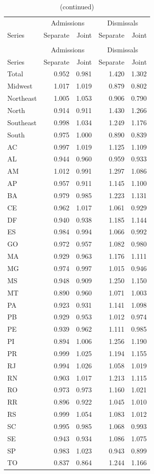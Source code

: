 \begin{longtable}{lrrrr}
\hline
 & \multicolumn{2}{c}{Admissions} & \multicolumn{2}{c}{Dismissals} \\
Series & Separate & Joint & Separate & Joint \\
\hline
\endfirsthead
\caption[]{(continued)} \\
\hline
 & \multicolumn{2}{c}{Admissions} & \multicolumn{2}{c}{Dismissals} \\
Series & Separate & Joint & Separate & Joint \\
\hline
\endhead
Total & 0.952 & 0.981 & 1.420 & 1.302 \\
Midwest & 1.017 & 1.019 & 0.879 & 0.802 \\
Northeast & 1.005 & 1.053 & 0.906 & 0.790 \\
North & 0.914 & 0.911 & 1.430 & 1.266 \\
Southeast & 0.998 & 1.034 & 1.249 & 1.176 \\
South & 0.975 & 1.000 & 0.890 & 0.839 \\
AC & 0.997 & 1.019 & 1.125 & 1.109 \\
AL & 0.944 & 0.960 & 0.959 & 0.933 \\
AM & 1.012 & 0.991 & 1.297 & 1.086 \\
AP & 0.957 & 0.911 & 1.145 & 1.100 \\
BA & 0.979 & 0.985 & 1.223 & 1.131 \\
CE & 0.962 & 1.017 & 1.061 & 0.929 \\
DF & 0.940 & 0.938 & 1.185 & 1.144 \\
ES & 0.984 & 0.994 & 1.066 & 0.992 \\
GO & 0.972 & 0.957 & 1.082 & 0.980 \\
MA & 0.929 & 0.963 & 1.176 & 1.111 \\
MG & 0.974 & 0.997 & 1.015 & 0.946 \\
MS & 0.948 & 0.909 & 1.250 & 1.150 \\
MT & 0.890 & 0.960 & 1.071 & 1.003 \\
PA & 0.923 & 0.931 & 1.141 & 1.098 \\
PB & 0.929 & 0.953 & 1.012 & 0.974 \\
PE & 0.939 & 0.962 & 1.111 & 0.985 \\
PI & 0.894 & 1.006 & 1.256 & 1.190 \\
PR & 0.999 & 1.025 & 1.194 & 1.155 \\
RJ & 0.994 & 1.026 & 1.058 & 1.019 \\
RN & 0.903 & 1.017 & 1.213 & 1.115 \\
RO & 0.973 & 0.973 & 1.160 & 1.021 \\
RR & 0.896 & 0.922 & 1.045 & 1.010 \\
RS & 0.999 & 1.054 & 1.083 & 1.012 \\
SC & 0.995 & 0.985 & 1.068 & 0.993 \\
SE & 0.943 & 0.934 & 1.086 & 1.075 \\
SP & 0.983 & 1.023 & 0.943 & 0.899 \\
TO & 0.837 & 0.864 & 1.244 & 1.166 \\
\hline
\end{longtable}
